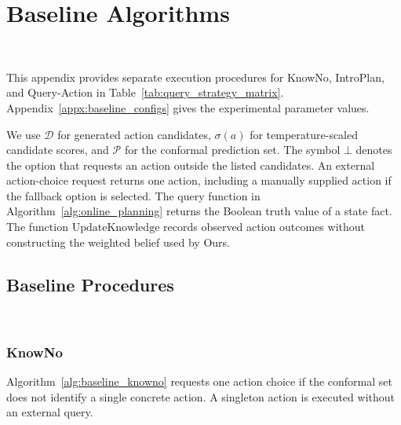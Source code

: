 \section{Baseline Algorithms}~\label{appx:comparison_algorithms}

This appendix provides separate execution procedures for KnowNo, IntroPlan, and Query-Action in Table~\ref{tab:query_strategy_matrix}. Appendix~\ref{appx:baseline_configs} gives the experimental parameter values.

We use $\mathcal{D}$ for generated action candidates, $\sigma(a)$ for temperature-scaled candidate scores, and $\mathcal{P}$ for the conformal prediction set. The symbol $\bot$ denotes the option that requests an action outside the listed candidates. An external action-choice request returns one action, including a manually supplied action if the fallback option is selected. The query function in Algorithm~\ref{alg:online_planning} returns the Boolean truth value of a state fact. The function $\mathrm{UpdateKnowledge}$ records observed action outcomes without constructing the weighted belief used by Ours.

\subsection{Baseline Procedures}~\label{appx:baseline_algorithms}

\subsubsection{KnowNo}
Algorithm~\ref{alg:baseline_knowno} requests one action choice if the conformal set does not identify a single concrete action. A singleton action is executed without an external query.

